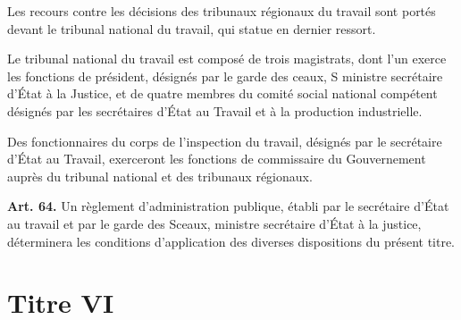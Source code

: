 \documentclass[french,twoside]{book} %
\newcommand{\labelchar}[1]{\textbf{\color{rubric} #1}}
\begin{document}
\noindent Les recours contre les décisions des tribunaux régionaux du travail sont portés devant le tribunal national du travail, qui statue en dernier ressort.\par
Le tribunal national du travail est composé de trois magistrats, dont l’un exerce les fonctions de président, désignés par le garde des ceaux, S ministre secrétaire d’État à la Justice, et de quatre membres du comité social national compétent désignés par les secrétaires d’État au Travail et à la production industrielle.\par
Des fonctionnaires du corps de l’inspection du travail, désignés par le secrétaire d’État au Travail, exerceront les fonctions de commissaire du Gouvernement auprès du tribunal national et des tribunaux régionaux.\par
\bigbreak
\noindent \labelchar{Art. 64.} Un règlement d’administration publique, établi par le secrétaire d’État au travail et par le garde des Sceaux, ministre secrétaire d’État à la justice, déterminera les conditions d’application des diverses dispositions du présent titre.
\section[Titre VI]{Titre VI}\renewcommand{\leftmark}{Titre VI}
\end{document}
